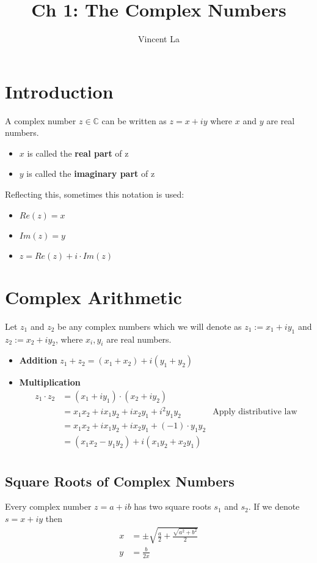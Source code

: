\documentclass[]{article}
\title{Ch 1: The Complex Numbers}
\author{Vincent La}
\begin{document}
\maketitle

\section{Introduction}
A complex number $z \in \mathbb{C}$ can be written as $z = x + iy$ where $x$ and $y$ are real numbers.
\begin{itemize}
	\item $x$ is called the \textbf{real part} of z
	\item $y$ is called the \textbf{imaginary part} of z
\end{itemize}

Reflecting this, sometimes this notation is used:
\begin{itemize}
	\item $Re(z) = x$
	\item $Im(z) = y$
	\item $z = Re(z) + i \cdot Im(z)$	
\end{itemize}

\section{Complex Arithmetic}
Let $z_1$ and $z_2$ be any complex numbers which we will denote as 
$z_1 := x_1 + iy_1$ and $z_2 := x_2 + iy_2$, where $x_i, y_i$ are real numbers.

\begin{itemize}
	\item \textbf{Addition} $z_1 + z_2 = (x_1 + x_2) + i(y_1 + y_2)$
	\item \textbf{Multiplication} 
	\[\begin{aligned}
	z_1 \cdot z_2
	&= (x_1 + iy_1)\cdot(x_2+iy_2) \\
	&= x_1x_2 + ix_1y_2 + ix_2y_1 + i^2y_1y_2 & \text{Apply distributive law} \\
	&= x_1x_2 + ix_1y_2 + ix_2y_1 + (-1)\cdot y_1y_2 \\
	&= (x_1x_2 - y_1y_2) + i(x_1y_2 + x_2y_1) \\
	\end{aligned}\]
\end{itemize}

\subsection{Square Roots of Complex Numbers}
Every complex number $z = a + ib$ has two square roots $s_1$ and $s_2$. If we denote $s = x + iy$ then
\[\begin{aligned}
x &= \pm \sqrt{\frac{a}{2} + \frac{\sqrt{a^2 + b^2}}{2}} \\
y &= \frac{b}{2x}
\end{aligned}\]
\end{document}
